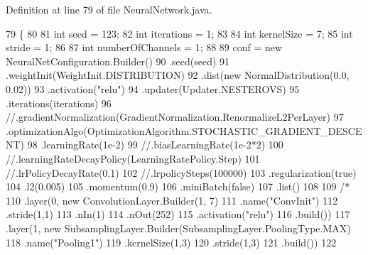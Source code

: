 Definition at line 79 of file Neural\-Network.\-java.


\begin{DoxyCode}
79                                                 \{
80         
81         \textcolor{keywordtype}{int} seed = 123;
82         \textcolor{keywordtype}{int} iterations = 1;
83         
84         \textcolor{keywordtype}{int} kernelSize = 7;
85         \textcolor{keywordtype}{int} stride = 1;
86         
87         \textcolor{keywordtype}{int} numberOfChannels = 1;
88         
89         conf = \textcolor{keyword}{new} NeuralNetConfiguration.Builder()
90                 .seed(seed)
91                 .weightInit(WeightInit.DISTRIBUTION)
92                 .dist(\textcolor{keyword}{new} NormalDistribution(0.0, 0.02))
93                 .activation(\textcolor{stringliteral}{"relu"})
94                 .updater(Updater.NESTEROVS)
95                 .iterations(iterations)
96                 \textcolor{comment}{//.gradientNormalization(GradientNormalization.RenormalizeL2PerLayer)}
97                 .optimizationAlgo(OptimizationAlgorithm.STOCHASTIC\_GRADIENT\_DESCENT)
98                 .learningRate(1e-2)
99                 \textcolor{comment}{//.biasLearningRate(1e-2*2)}
100                 \textcolor{comment}{//.learningRateDecayPolicy(LearningRatePolicy.Step)}
101                 \textcolor{comment}{//.lrPolicyDecayRate(0.1)}
102                 \textcolor{comment}{//.lrpolicySteps(100000)}
103                 .regularization(\textcolor{keyword}{true})
104                 .l2(0.005)
105                 .momentum(0.9)
106                 .miniBatch(\textcolor{keyword}{false})
107                 .list()
108                 
109                 \textcolor{comment}{/*}
110 \textcolor{comment}{                .layer(0, new ConvolutionLayer.Builder(1, 7)}
111 \textcolor{comment}{                        .name("ConvInit")}
112 \textcolor{comment}{                        .stride(1,1)}
113 \textcolor{comment}{                        .nIn(1)}
114 \textcolor{comment}{                        .nOut(252)}
115 \textcolor{comment}{                        .activation("relu")}
116 \textcolor{comment}{                        .build())}
117 \textcolor{comment}{                .layer(1, new SubsamplingLayer.Builder(SubsamplingLayer.PoolingType.MAX)}
118 \textcolor{comment}{                        .name("Pooling1")}
119 \textcolor{comment}{                        .kernelSize(1,3)}
120 \textcolor{comment}{                        .stride(1,3)}
121 \textcolor{comment}{                        .build())}
122 \textcolor{comment}{                }

\end{DoxyCode}
